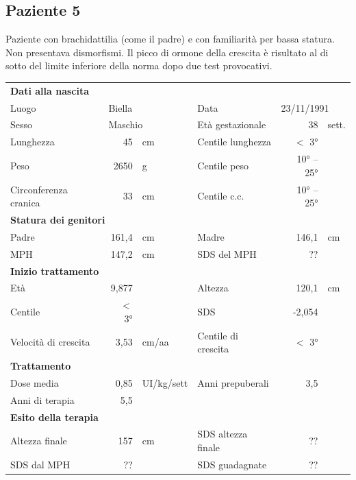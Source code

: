 \subsection*{Paziente 5}%

Paziente con brachidattilia (come il padre) e con familiarità per bassa statura. Non presentava dismorfismi. Il picco di ormone della crescita è risultato al di sotto del limite inferiore della norma dopo due test provocativi.

\begin{table}[!h]
\begin{tabular}{lrllrl}
\toprule
\multicolumn{6}{l}{\textbf{Dati alla nascita}}\\
Luogo 		& \multicolumn{2}{l}{Biella} 	& Data 					& \multicolumn{2}{l}{23/11/1991} 	\\
Sesso 		& \multicolumn{2}{l}{Maschio} 	& Età gestazionale 		& 38 		& sett.\\
Lunghezza 	& 45 		& cm 				& Centile lunghezza		& $<$ 3° 		\\
Peso 		& 2650 		& g					& Centile peso			& 10° -- 25° 		\\
Circonferenza cranica	& 33 		& cm 	& Centile c.c.			& 10° -- 25° \\
\midrule
\multicolumn{6}{l}{\textbf{Statura dei genitori}}\\
Padre 		& 161,4 & cm 	& Madre 				& 146,1 & cm \\
MPH 		& 147,2 & cm 	& SDS del MPH 			& ??\\
\midrule
\multicolumn{6}{l}{\textbf{Inizio trattamento}} \\
Età	& 9,877 & 		& Altezza 				& 120,1 & cm  \\
Centile & $<$ 3° 	 &		& SDS		& -2,054 \\
Velocità di crescita & 3,53 & cm/aa	& Centile di crescita & $<$ 3°\\
\midrule
\multicolumn{6}{l}{\textbf{Trattamento}} \\
Dose media		& 0,85 & UI/kg/sett & Anni prepuberali & 3,5\\
Anni di terapia & 5,5\\
\midrule
\multicolumn{6}{l}{\textbf{Esito della terapia}} \\
Altezza finale			& 157 & cm 	& SDS altezza finale		& ??\\
SDS dal MPH				& ?? &		& SDS guadagnate 			& ??\\
\bottomrule
\end{tabular}
\end{table}
\clearpage

